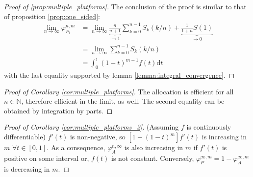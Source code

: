 \documentclass[a4paper]{article}
\newcommand{\dt}{\mathrm{d}t}
\begin{document}
\begin{proof}[Proof of \cref{prop:multiple_platforms}]
    The conclusion of the proof is similar to that of proposition \ref{prop:one_sided}:
    \begin{align*}
        \lim_{n \to \infty} \varphi_{P_i}^{n, m} &= \lim_{n \to \infty} \underbrace{\frac{n}{n+1}}_{\to 1} \sum_{k=0}^{n-1} S_k(k/n) + \underbrace{\frac{1}{1+n}S(1)}_{\to 0} \\
        &= \lim_{n \to \infty} \sum_{k=0}^{n-1} S_k(k/n) \\
        &= \int_0^1 (1-t)^{m-1} f(t) \dt
    \end{align*}
    with the last equality supported by lemma \ref{lemma:integral_convergence}.
\end{proof}

\begin{proof}[Proof of Corollary \ref{cor:multiple_platforms}]
    The allocation is efficient for all $n \in \mathbb{N}$, therefore efficient in the limit, as well.
    The second equality can be obtained by integration by parts.
\end{proof}

\begin{proof}[Proof of Corollary \ref{cor:multiple_platforms_2}] (Assuming $f$ is continuously differentiable) %
    $f'(t)$ is non-negative, so $[1 - (1-t)^m] f'(t)$ is increasing in $m$ $\forall t \in [0, 1]$.
    As a consequence, $\varphi_A^{n, \infty}$ is also increasing in $m$ if $f'(t)$ is positive on some interval or, $f(t)$ is not constant.
    Conversely, $\varphi_{P}^{\infty, m} = 1 - \varphi_{A}^{\infty, m}$ is decreasing in $m$.
\end{proof}
\end{document}
